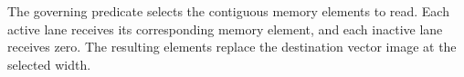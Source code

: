The governing predicate selects the contiguous memory elements to read. Each
active lane receives its corresponding memory element, and each inactive lane
receives zero. The resulting elements replace the destination vector image at
the selected width.
